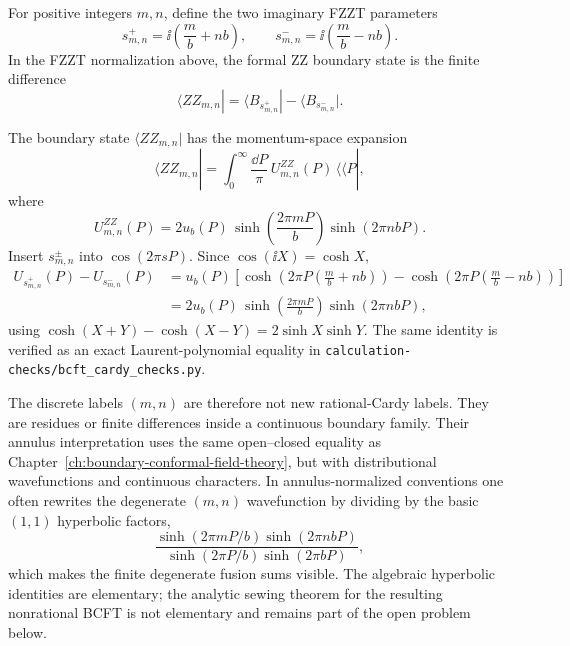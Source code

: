 \begin{definition}
\label{def:zz-boundary-state}
For positive integers \(m,n\), define the two imaginary FZZT parameters
\[
  s_{m,n}^{+}=\ii\left(\frac{m}{b}+nb\right),
  \qquad
  s_{m,n}^{-}=\ii\left(\frac{m}{b}-nb\right).
\]
In the FZZT normalization above, the formal ZZ boundary state is the finite
difference
\begin{equation}
  \langle ZZ_{m,n}|
  =
  \langle B_{s_{m,n}^{+}}|
  -
  \langle B_{s_{m,n}^{-}}| .
  \label{eq:zz-as-fzzt-difference}
\end{equation}
\end{definition}

\begin{remark}
\label{prop:zz-wavefunction-fzzt-normalization}
The boundary state \(\langle ZZ_{m,n}|\) has the momentum-space expansion
\begin{equation}
  \langle ZZ_{m,n}|
  =
  \int_0^\infty\frac{\dd P}{\pi}\,
  U_{m,n}^{ZZ}(P)\,\langle\!\langle P|,
  \label{eq:zz-boundary-state-wavefunction}
\end{equation}
where
\begin{equation}
  U_{m,n}^{ZZ}(P)
  =
  2u_b(P)\,
  \sinh\!\left(\frac{2\pi mP}{b}\right)
  \sinh(2\pi nbP).
  \label{eq:zz-wavefunction}
\end{equation}
Insert \(s_{m,n}^{\pm}\) into \(\cos(2\pi sP)\).  Since
\(\cos(\ii X)=\cosh X\),
\[
\begin{aligned}
  U_{s_{m,n}^{+}}(P)-U_{s_{m,n}^{-}}(P)
  &=
  u_b(P)
  \left[
    \cosh\!\left(2\pi P\left(\frac mb+nb\right)\right)
    -
    \cosh\!\left(2\pi P\left(\frac mb-nb\right)\right)
  \right]
  \\
  &=
  2u_b(P)\,
  \sinh\!\left(\frac{2\pi mP}{b}\right)\sinh(2\pi nbP),
\end{aligned}
\]
using \(\cosh(X+Y)-\cosh(X-Y)=2\sinh X\sinh Y\).  The same identity is
verified as an exact Laurent-polynomial equality in
\texttt{calculation-checks/bcft\_cardy\_checks.py}.
\end{remark}

The discrete labels \((m,n)\) are therefore not new rational-Cardy labels.
They are residues or finite differences inside a continuous boundary family.
Their annulus interpretation uses the same open--closed equality as
Chapter~\ref{ch:boundary-conformal-field-theory}, but with distributional
wavefunctions and continuous characters.  In annulus-normalized conventions
one often rewrites the degenerate \((m,n)\) wavefunction by dividing by the
basic \((1,1)\) hyperbolic factors,
\[
  \frac{\sinh(2\pi mP/b)\sinh(2\pi nbP)}
       {\sinh(2\pi P/b)\sinh(2\pi bP)} ,
\]
which makes the finite degenerate fusion sums visible.  The algebraic
hyperbolic identities are elementary; the analytic sewing theorem for the
resulting nonrational BCFT is not elementary and remains part of the open
problem below.

